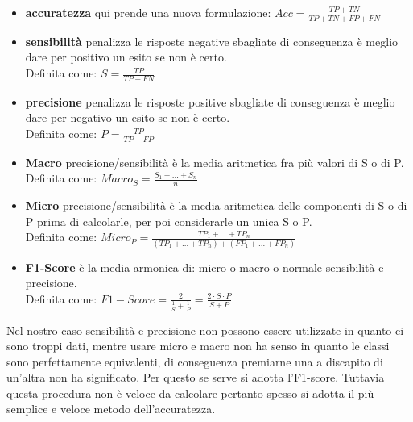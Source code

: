 \begin{itemize}
	\item \textbf{accuratezza} qui prende una nuova formulazione: $\displaystyle Acc = \frac{TP + TN}{TP + TN + FP + FN} $
	\item \textbf{sensibilità} penalizza le risposte negative sbagliate di conseguenza è meglio dare per positivo un esito se non è certo.\\
	Definita come: $\displaystyle S = \frac{TP}{TP + FN} $
	\item \textbf{precisione} penalizza le risposte positive sbagliate di conseguenza è meglio dare per negativo un esito se non è certo.\\
	Definita come: $\displaystyle P = \frac{TP}{TP + FP} $
	\item \textbf{Macro} precisione/sensibilità è la media aritmetica fra più valori di S o di P.\\
	Definita come: $\displaystyle Macro_{S} = \frac{S_1 + ... + S_n}{n} $
	\item \textbf{Micro} precisione/sensibilità è la media aritmetica delle componenti di S o di P prima di calcolarle, per poi considerarle un unica S o P.\\
	Definita come: $\displaystyle Micro_{P} = \frac{TP_1 + ... + TP_n }{ (TP_1 + ... + TP_n) + (FP_1 + ... + FP_n) } $
	\item \textbf{F1-Score} è la media armonica di: micro o macro o normale sensibilità e precisione.\\
	Definita come: $\displaystyle F1-Score = \frac{2}{ \frac{1}{S} + \frac{1}{P} } = \frac{2 \cdot S \cdot P}{ S + P }$
\end{itemize}
Nel nostro caso sensibilità e precisione non possono essere utilizzate in quanto ci sono troppi dati, mentre usare micro e macro non ha senso in quanto le classi sono perfettamente equivalenti, di conseguenza premiarne una a discapito di un'altra non ha significato. Per questo se serve si adotta l'F1-score. Tuttavia questa procedura non è veloce da calcolare pertanto spesso si adotta il più semplice e veloce metodo dell'accuratezza.
%
